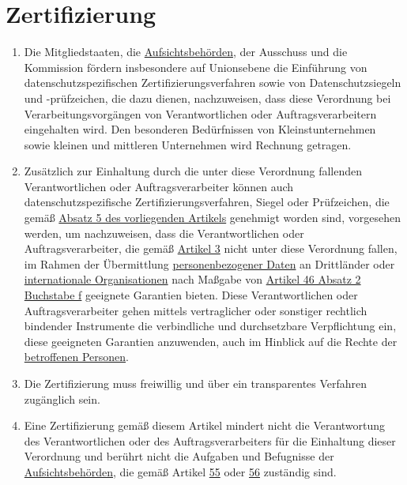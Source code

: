 \chapter{Zertifizierung}
\label{ch:42}


\begin{enumerate}

  \item Die Mitgliedstaaten, die \hyperref[itm:04-21]{Aufsichtsbehörden}, der Ausschuss und die Kommission fördern insbesondere auf
   Unionsebene die Einführung von datenschutzspezifischen Zertifizierungsverfahren sowie von Datenschutzsiegeln
   und -prüfzeichen, die dazu dienen, nachzuweisen, dass diese Verordnung bei Verarbeitungsvorgängen von
   Verantwortlichen oder Auftragsverarbeitern eingehalten wird. Den besonderen Bedürfnissen von Kleinstunternehmen
   sowie kleinen und mittleren Unternehmen wird Rechnung getragen.
  \label{itm:42-1}

  \item Zusätzlich zur Einhaltung durch die unter diese Verordnung fallenden Verantwortlichen oder Auftragsverarbeiter
   können auch datenschutzspezifische Zertifizierungsverfahren, Siegel oder Prüfzeichen, die gemäß \hyperref[itm:42-5]
   {Absatz 5 des vorliegenden Artikels} genehmigt worden sind, vorgesehen werden, um nachzuweisen, dass die
   Verantwortlichen oder Auftragsverarbeiter, die gemäß \hyperref[ch:3]{Artikel 3} nicht unter diese Verordnung
   fallen, im Rahmen der Übermittlung \hyperref[itm:04-1]{personenbezogener Daten} an Drittländer oder \hyperref[itm:04-29]{internationale Organisationen} nach
   Maßgabe von \hyperref[itm:46-2f]{Artikel 46 Absatz 2 Buchstabe f} geeignete Garantien bieten. Diese Verantwortlichen
   oder Auftragsverarbeiter gehen mittels vertraglicher oder sonstiger rechtlich bindender Instrumente die verbindliche
   und durchsetzbare Verpflichtung ein, diese geeigneten Garantien anzuwenden, auch im Hinblick auf die Rechte der
   \hyperref[itm:04-1]{betroffenen Personen}.
  \label{itm:42-2}

  \item Die Zertifizierung muss freiwillig und über ein transparentes Verfahren zugänglich sein.
  \label{itm:42-3}

  \item Eine Zertifizierung gemäß diesem Artikel mindert nicht die Verantwortung des Verantwortlichen oder des
   Auftragsverarbeiters für die Einhaltung dieser Verordnung und berührt nicht die Aufgaben und Befugnisse der
   \hyperref[itm:04-21]{Aufsichtsbehörden}, die gemäß Artikel \hyperref[ch:55]{55} oder \hyperref[ch:56]{56} zuständig sind.
  \label{itm:42-4}


\end{enumerate}
